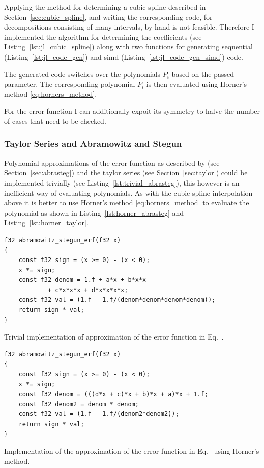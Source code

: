 \documentclass[a4paper, 11pt]{memoir}
\begin{document}
    Applying the method for determining a cubic spline described in Section~\ref{sec:cubic_spline}, and writing the
    corresponding code, for decompositions consisting of many intervals, by hand is not feasible. Therefore I implemented 
    the algorithm for determining the coefficients (see Listing~\ref{lst:jl_cubic_spline}) along with two functions for
    generating sequential (Listing~\ref{lst:jl_code_gen}) and \gls{simd} (Listing~\ref{lst:jl_code_gen_simd}) code.
    
    The generated code switches over the polynomials $P_i$ based on the passed parameter. The corresponding polynomial
    $P_i$ is then evaluated using Horner's method \eqref{eq:horners_method}.

    For the error function I can additionally expoit its symmetry to halve the number of cases that need to be checked.

    \subsubsection{Taylor Series and Abramowitz and Stegun}
    \label{sec:impl_abrasteg_taylor}
    Polynomial approximations of the error function as described by \citeauthor{AbraSteg72} (see
    Section~\ref{sec:abrasteg}) and the taylor series (see Section~\ref{sec:taylor}) could be implemented trivially (see
    Listing~\ref{lst:trivial_abrasteg}), this however is an inefficient way of evaluating polynomials. As with the cubic
    spline interpolation above it is better to use Horner's method \eqref{eq:horners_method} to evaluate the polynomial
    as shown in Listing~\ref{lst:horner_abrasteg} and Listing~\ref{lst:horner_taylor}.

    \begin{listing}[H]
        \begin{verbatim}
f32 abramowitz_stegun_erf(f32 x)
{
    const f32 sign = (x >= 0) - (x < 0);
    x *= sign;
    const f32 denom = 1.f + a*x + b*x*x
            + c*x*x*x + d*x*x*x*x;
    const f32 val = (1.f - 1.f/(denom*denom*denom*denom));
    return sign * val;
}
        \end{verbatim}
        \caption{Trivial implementation of approximation of the error function in Eq.~.}
        \label{lst:trivial_abrasteg}
    \end{listing}

    \begin{listing}[H]
        \begin{verbatim}
f32 abramowitz_stegun_erf(f32 x)
{
    const f32 sign = (x >= 0) - (x < 0);
    x *= sign;
    const f32 denom = (((d*x + c)*x + b)*x + a)*x + 1.f;
    const f32 denom2 = denom * denom;
    const f32 val = (1.f - 1.f/(denom2*denom2));
    return sign * val;
}
        \end{verbatim}
        \caption{Implementation of the approximation of the error function in Eq.~ using Horner's method.}
        \label{lst:horner_abrasteg}
    \end{listing}
\end{document}
